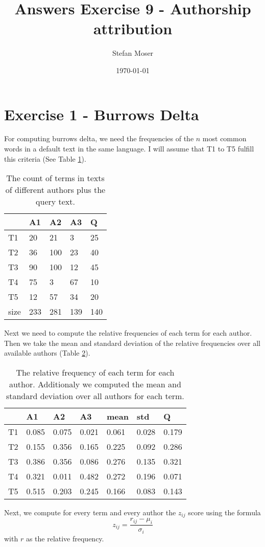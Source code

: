 \documentclass[11pt]{article}
\title{\textbf{Answers Exercise 9 - Authorship attribution}}
\author{Stefan Moser}
\date{\today}
\begin{document}
\maketitle

\section*{Exercise 1 - Burrows Delta}
For computing burrows delta, we need the 
frequencies of the $n$ most common words in a default text in the same language. I will
assume that T1 to T5 fulfill this criteria (See Table \ref{table:count}). 
\begin{table}[h]
\center
\begin{tabular}{|l|l|l|l|l|}
\hline
	 & A1 & A2 & A3 & Q\\
\hline
	T1 & 20 & 21 & 3 & 25\\
\hline
	T2 & 36 & 100 & 23 & 40\\
\hline
	T3 & 90 & 100 & 12 & 45\\
\hline
	T4 & 75 & 3 & 67 & 10\\
\hline
	T5 & 12 & 57 & 34 & 20\\
\hline
	size & 233 & 281 & 139 & 140\\
\hline
\end{tabular}
\caption{The count of terms in texts of different authors plus the query text.}
\label{table:count}
\end{table}
Next we need to compute the relative frequencies of each term for each author. Then we take the mean and standard deviation of the relative frequencies over
all available authors (Table \ref{table:rel_freq}).
\begin{table}[h]
\center
\begin{tabular}{|l|l|l|l|l|l||l|}
\hline
	 & A1 & A2 & A3 & mean & std & Q\\
\hline
	T1 & 0.085 & 0.075 & 0.021 & 0.061 & 0.028 & 0.179\\
\hline
	T2 & 0.155 & 0.356 & 0.165 & 0.225 & 0.092 & 0.286 \\
\hline
	T3 & 0.386 & 0.356 & 0.086 & 0.276 & 0.135 & 0.321 \\
\hline
	T4 & 0.321 & 0.011 & 0.482 & 0.272 & 0.196 & 0.071 \\
\hline
	T5 & 0.515 & 0.203 & 0.245 & 0.166 & 0.083 & 0.143 \\
\hline
\end{tabular}
\caption{The relative frequency of each term
for each author. Additionaly we computed
the mean and standard deviation over all
authors for each term.}
\label{table:rel_freq}
\end{table}
Next, we compute for every term and every author the $z_{ij}$ score using the formula
\begin{equation}
	z_{ij} = \frac{r_{ij} - \mu_i}{\sigma_i}
\end{equation}
with $r$ as the relative frequency. 
\end{document}
